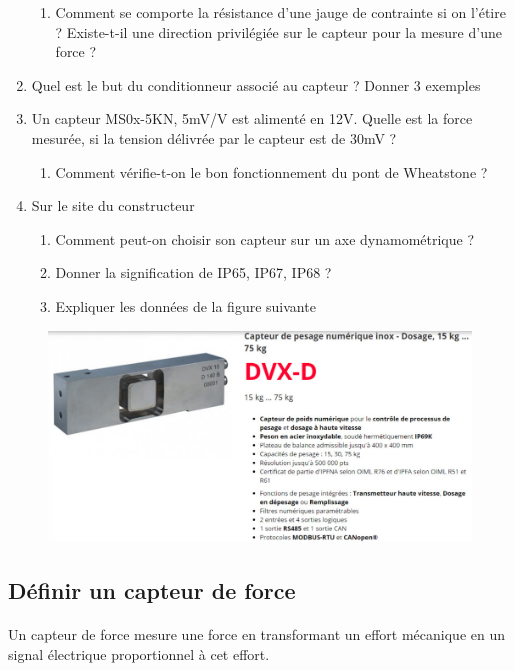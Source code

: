 \documentclass{article}
\begin{document}
\begin{enumerate}
\begin{enumerate}
        \item Comment se comporte la résistance d’une jauge de contrainte si on l’étire ? Existe-t-il une direction privilégiée sur le capteur pour la mesure d’une force ?
    \end{enumerate}
    \item Quel est le but du conditionneur associé au capteur ? Donner 3 exemples
    \item Un capteur MS0x-5KN, 5mV/V est alimenté en 12V. Quelle est la force mesurée, si la tension délivrée par le capteur est de 30mV ?
    \begin{enumerate}
        \item Comment vérifie-t-on le bon fonctionnement du pont de Wheatstone ?
    \end{enumerate}
    \item Sur le site du constructeur
    \begin{enumerate}
        \item Comment peut-on choisir son capteur sur un axe dynamométrique ?
        \item Donner la signification de IP65, IP67, IP68 ?
        \item Expliquer les données de la figure suivante
    \end{enumerate}
\end{enumerate}

\begin{figure}[H]
    \centering
    \includegraphics[width=\linewidth]{./images/capteur-force-scaime.jpg}
\end{figure}

\subsection{Définir un capteur de force}
\paragraph{}
Un capteur de force mesure une force en transformant un effort mécanique en un signal électrique proportionnel à cet effort.
\end{document}
